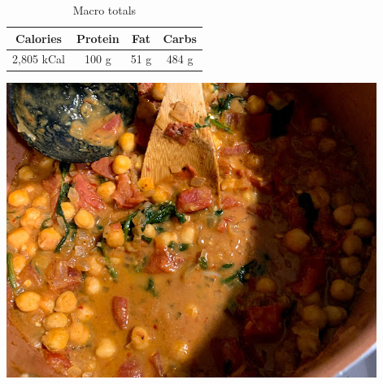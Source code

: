 \begin{multicols}{2}
\begin{enumerate}
\end{enumerate}
\begin{table}[H]
  \begin{center}
    \caption{Macro totals}
    \label{tab:table1}
    \begin{tabular}{c|c|c|c} %
      \textbf{Calories} & \textbf{Protein} & \textbf{Fat} & \textbf{Carbs}\\
      \hline
      2,805 kCal & 100 g & 51 g & 484 g\\
    \end{tabular}
  \end{center}
\end{table}
\end{multicols}



\vspace{4mm}
\begin{center}
\includegraphics[scale=0.65]{Vegetarian Recipes/Coconut Chickpea Curry/chickpeacurry.jpg}
\end{center}